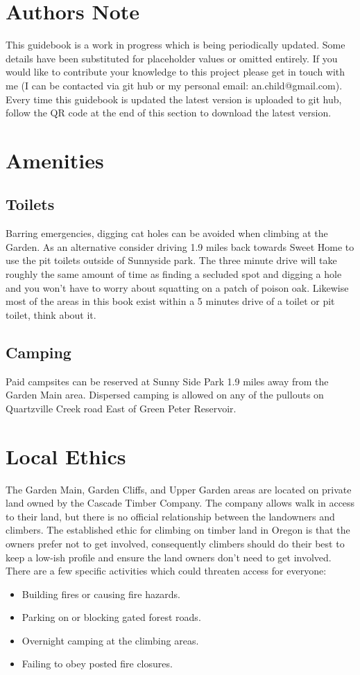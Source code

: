 \section{Authors Note}
This guidebook is a work in progress which is being periodically updated. Some details have been substituted for placeholder values or omitted entirely. If you would like to contribute your knowledge to this project please get in touch with me (I can be contacted via git hub or my personal email: an.child@gmail.com). Every time this guidebook is updated the latest version is uploaded to git hub, follow the QR code at the end of this section to download the latest version.
\section{Amenities}
\subsection*{Toilets}
Barring emergencies, digging cat holes can be avoided when climbing at the Garden. As an alternative consider driving 1.9 miles back towards Sweet Home to use the pit toilets outside of Sunnyside park. The three minute drive will take roughly the same amount of time as finding a secluded spot and digging a hole and you won't have to worry about squatting on a patch of poison oak. Likewise most of the areas in this book exist within a 5 minutes drive of a toilet or pit toilet, think about it. 
\subsection*{Camping}
Paid campsites can be reserved at Sunny Side Park 1.9 miles away from the Garden Main area. Dispersed camping is allowed on any of the pullouts on Quartzville Creek road East of Green Peter Reservoir. 
\section{Local Ethics}
The Garden Main, Garden Cliffs, and Upper Garden areas are located on private land owned by the Cascade Timber Company. The company allows walk in access to their land, but there is no official relationship between the landowners and climbers. The established ethic for climbing on timber land in Oregon is that the owners prefer not to get involved, consequently climbers should do their best to keep a low-ish profile and ensure the land owners don't need to get involved. There are a few specific activities which could threaten access for everyone:\\
\begin{itemize}
\item Building fires or causing fire hazards.\\
\item Parking on or blocking gated forest roads.\\
\item Overnight camping at the climbing areas.\\
\item Failing to obey posted fire closures.\\
\end{itemize}

